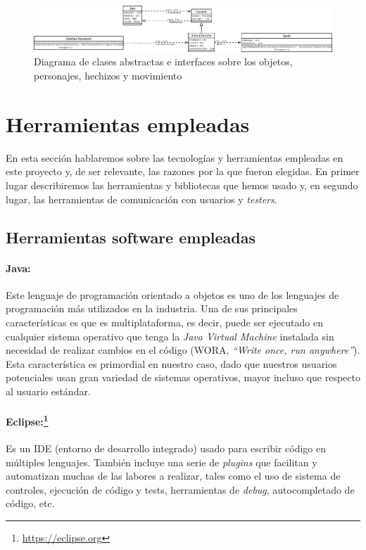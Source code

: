 \begin{figure}
    \includegraphics[width=\textwidth,height=0.15\textwidth]{./img/charactersitems.png}
	\caption{Diagrama de clases abstractas e interfaces sobre los objetos, personajes, hechizos y movimiento}
	\label{fig:charactersitems}
\end{figure}

\section{Herramientas empleadas}

En esta sección hablaremos sobre las tecnologías y herramientas empleadas en este proyecto y, de ser relevante, las razones por la que fueron elegidas. En primer lugar describiremos las herramientas y bibliotecas que hemos usado y, en segundo lugar, las herramientas de comunicación con usuarios y \textit{testers}.

\subsection{Herramientas software empleadas}

\paragraph{Java:} Este lenguaje de programación orientado a objetos es uno de los lenguajes de programación más utilizados en la industria. Una de sus principales características es que es multiplataforma, es decir, puede ser ejecutado en cualquier sistema operativo que tenga la \textit{Java Virtual Machine} instalada sin necesidad de realizar cambios en el código (WORA, \textit{``Write once, run anywhere''}). Esta característica es primordial en nuestro caso, dado que nuestros usuarios potenciales usan gran variedad de sistemas operativos, mayor incluso que respecto al usuario estándar.

 \paragraph{Eclipse:\protect\footnote{\protect\url{https://eclipse.org}}} Es un IDE (entorno de desarrollo integrado) usado para escribir código en múltiples lenguajes. También incluye una serie de \textit{plugins} que facilitan y automatizan muchas de las labores a realizar, tales como el uso de sistema de controles, ejecución de código y tests, herramientas de \textit{debug}, autocompletado de código, etc.

